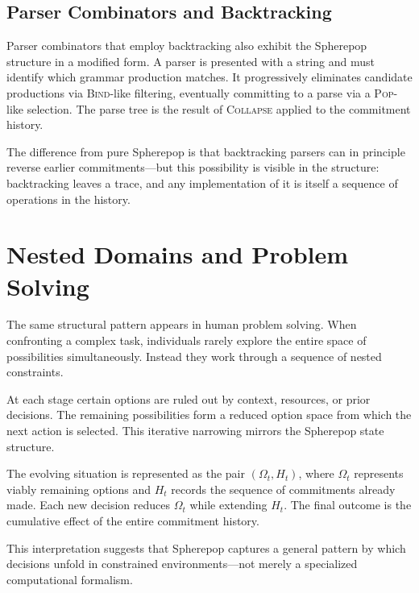 \documentclass[12pt]{article}
\begin{document}
\subsection{Parser Combinators and Backtracking}

Parser combinators that employ backtracking also exhibit the Spherepop structure in a modified form. A parser is presented with a string and must identify which grammar production matches. It progressively eliminates candidate productions via \textsc{Bind}-like filtering, eventually committing to a parse via a \textsc{Pop}-like selection. The parse tree is the result of \textsc{Collapse} applied to the commitment history.

The difference from pure Spherepop is that backtracking parsers can in principle reverse earlier commitments---but this possibility is visible in the structure: backtracking leaves a trace, and any implementation of it is itself a sequence of operations in the history.

\section{Nested Domains and Problem Solving}
\label{sec:problemsolving}

The same structural pattern appears in human problem solving. When confronting a complex task, individuals rarely explore the entire space of possibilities simultaneously. Instead they work through a sequence of nested constraints.

At each stage certain options are ruled out by context, resources, or prior decisions. The remaining possibilities form a reduced option space from which the next action is selected. This iterative narrowing mirrors the Spherepop state structure.

The evolving situation is represented as the pair $(\Omega_t, H_t)$, where $\Omega_t$ represents viably remaining options and $H_t$ records the sequence of commitments already made. Each new decision reduces $\Omega_t$ while extending $H_t$. The final outcome is the cumulative effect of the entire commitment history.

This interpretation suggests that Spherepop captures a general pattern by which decisions unfold in constrained environments---not merely a specialized computational formalism.

\end{document}
